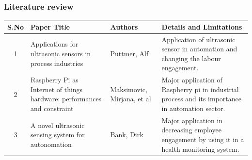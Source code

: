 \documentclass{beamer}
\begin{document}
\begin{frame}[shrink=20]\frametitle{Literature review}
\begin{table}[h]
    \begin{tabular}{|c|p{3cm}|p{3cm}|p{3cm}|}
    \hline
    \textbf{S.No} & \textbf{Paper Title} & \textbf{Authors} & \textbf{Details and Limitations}\\
    \hline 
    1 &Applications for ultrasonic sensors in process industries &  Puttmer, Alf &Application of ultrasonic sensor in automation and changing the labour engagement.\\
    \hline
    2 &Raspberry Pi as Internet of things hardware: performances and constraint & Maksimovic, Mirjana, et al & Major application of Raspberry pi in industrial process and its importance in automation sector.\\
    \hline
    3 & A novel ultrasonic sensing system for autonomation  &  Bank, Dirk & Major application in decreasing employee engagement by using it in a health monitoring system.\\
    \hline
 
  \end{tabular}
\end{table}
\end{frame}
\end{document}
